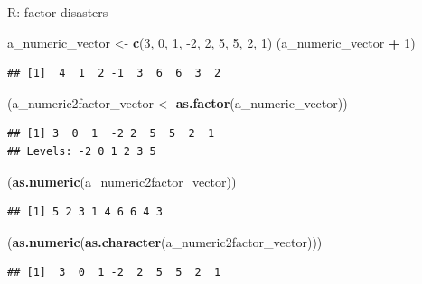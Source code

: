 \documentclass[
  ignorenonframetext,
]{beamer}
\newenvironment{Shaded}{\begin{snugshade}}{\end{snugshade}}
\newcommand{\DecValTok}[1]{\textcolor[rgb]{0.00,0.00,0.81}{#1}}
\newcommand{\KeywordTok}[1]{\textcolor[rgb]{0.13,0.29,0.53}{\textbf{#1}}}
\newcommand{\NormalTok}[1]{#1}
\newcommand{\OperatorTok}[1]{\textcolor[rgb]{0.81,0.36,0.00}{\textbf{#1}}}
\newcommand{\StringTok}[1]{\textcolor[rgb]{0.31,0.60,0.02}{#1}}
\begin{document}
\begin{frame}[fragile]{R: factor disasters}
\protect\hypertarget{r-factor-disasters}{}

\begin{Shaded}
\begin{Highlighting}[]
\NormalTok{a_numeric_vector <-}\StringTok{ }\KeywordTok{c}\NormalTok{(}\DecValTok{3}\NormalTok{, }\DecValTok{0}\NormalTok{, }\DecValTok{1}\NormalTok{, }\DecValTok{-2}\NormalTok{, }\DecValTok{2}\NormalTok{, }\DecValTok{5}\NormalTok{, }\DecValTok{5}\NormalTok{, }\DecValTok{2}\NormalTok{, }\DecValTok{1}\NormalTok{)}
\NormalTok{(a_numeric_vector }\OperatorTok{+}\StringTok{ }\DecValTok{1}\NormalTok{)}
\end{Highlighting}
\end{Shaded}

\begin{verbatim}
## [1]  4  1  2 -1  3  6  6  3  2
\end{verbatim}

\begin{Shaded}
\begin{Highlighting}[]
\NormalTok{(a_numeric2factor_vector <-}\StringTok{ }\KeywordTok{as.factor}\NormalTok{(a_numeric_vector))}
\end{Highlighting}
\end{Shaded}

\begin{verbatim}
## [1] 3  0  1  -2 2  5  5  2  1 
## Levels: -2 0 1 2 3 5
\end{verbatim}

\begin{Shaded}
\begin{Highlighting}[]
\NormalTok{(}\KeywordTok{as.numeric}\NormalTok{(a_numeric2factor_vector))}
\end{Highlighting}
\end{Shaded}

\begin{verbatim}
## [1] 5 2 3 1 4 6 6 4 3
\end{verbatim}

\begin{Shaded}
\begin{Highlighting}[]
\NormalTok{(}\KeywordTok{as.numeric}\NormalTok{(}\KeywordTok{as.character}\NormalTok{(a_numeric2factor_vector)))}
\end{Highlighting}
\end{Shaded}

\begin{verbatim}
## [1]  3  0  1 -2  2  5  5  2  1
\end{verbatim}

\end{frame}
\end{document}
